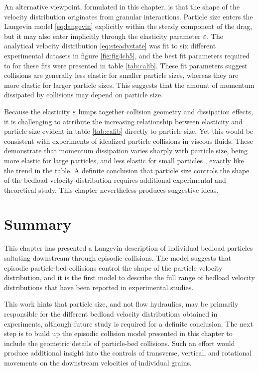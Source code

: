 An alternative viewpoint, formulated in this chapter, is that the shape of the velocity distribution originates from granular interactions.
Particle size enters the Langevin model \ref{eq:langevin} explicitly within the steady component of the drag, but it may also enter implicitly through the elasticity parameter $\varepsilon$.
The analytical velocity distribution \ref{eq:steadystate} was fit to six different experimental datasets in figure \ref{fig:fig4ch5}, and the best fit parameters required to for these fits were presented in table \ref{tab:calib}.
These fit parameters suggest collisions are generally less elastic for smaller particle sizes, whereas they are more elastic for larger particle sizes. This suggests that the amount of momentum dissipated by collisions may depend on particle size.

Because the elasticity $\varepsilon$ lumps together collision geometry and dissipation effects, it is challenging to attribute the increasing relationship between elasticity and particle size evident in table \ref{tab:calib} directly to particle size.
Yet this would be consistent with experiments of idealized particle collisions in viscous fluids. These demonstrate that momentum dissipation varies sharply with particle size, being more elastic for large particles, and less elastic for small particles \citep{Joseph2001,Yang2006,Schmeeckle2001}, exactly like the trend in the table.
A definite conclusion that particle size controls the shape of the bedload velocity distribution requires additional experimental and theoretical study. This chapter nevertheless produces suggestive ideas.

\section{Summary}
\label{sec:langconclusion}
This chapter has presented a Langevin description of individual bedload particles saltating downstream through episodic collisions.
The model suggests that episodic particle-bed collisions control the shape of the particle velocity distribution, and it is the first model to describe the full range of bedload velocity distributions that have been reported in experimental studies.

This work hints that particle size, and not flow hydraulics, may be primarily responsible for the different bedload velocity distributions obtained in experiments, although future study is required for a definite conclusion.
The next step is to build up the episodic collision model presented in this chapter to include the geometric details of particle-bed collisions.
Such an effort would produce additional insight into the controls of transverse, vertical, and rotational movements on the downstream velocities of individual grains.

